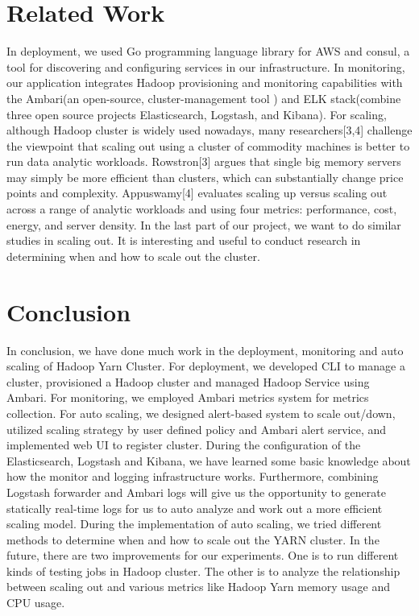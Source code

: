 \documentclass{article}
\begin{document}
\section{Related Work}
In deployment, we used Go programming language library for AWS and consul, a tool for discovering and configuring services in our infrastructure. In monitoring, our application integrates Hadoop provisioning and monitoring capabilities with the Ambari(an open-source, cluster-management tool ) and ELK stack(combine three open source projects Elasticsearch, Logstash, and Kibana). For scaling, although Hadoop cluster is widely used nowadays, many researchers[3,4] challenge the viewpoint that scaling out using a cluster of commodity machines is better to run data analytic workloads. Rowstron[3] argues that single big memory servers may simply be more efficient than clusters, which can substantially change price points and complexity.  Appuswamy[4] evaluates scaling up versus scaling out across a range of analytic workloads and using four metrics: performance, cost, energy, and server density. In the last part of our project, we want to do similar studies in scaling out. It is interesting and useful to conduct research in determining when and how to scale out the cluster.


\section{Conclusion}
In conclusion, we have done much work in the deployment, monitoring and auto scaling of Hadoop Yarn Cluster. For deployment, we developed CLI to manage a cluster, provisioned a Hadoop cluster and managed Hadoop Service using Ambari. For monitoring, we employed Ambari metrics system for metrics collection. For auto scaling, we designed alert-based system to scale out/down, utilized scaling strategy by user defined policy and Ambari alert service, and implemented web UI to register cluster. During the configuration of the Elasticsearch, Logstash and Kibana, we have learned some basic knowledge about how the monitor and logging infrastructure works. Furthermore,  combining Logstash forwarder and Ambari logs will give us the opportunity to generate statically real-time logs for us to auto analyze and work out a more efficient scaling model. During the implementation of auto scaling, we tried different methods to determine when and how to scale out the YARN cluster. In the future, there are two improvements for our experiments. One is to run different kinds of testing jobs in Hadoop cluster. The other is to analyze the relationship between scaling out and various metrics like Hadoop Yarn memory usage and CPU usage.
\end{document}

